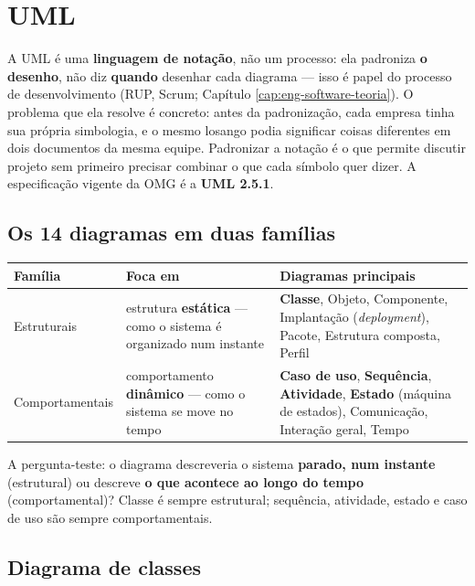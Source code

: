 \section{UML}
\label{sec:uml-teoria}

\begin{conceito}
A UML é uma \textbf{linguagem de notação}, não um processo: ela padroniza
\textbf{o desenho}, não diz \textbf{quando} desenhar cada diagrama --- isso
é papel do processo de desenvolvimento (RUP, Scrum; Capítulo
\ref{cap:eng-software-teoria}). O problema que ela resolve é concreto:
antes da padronização, cada empresa tinha sua própria simbologia, e o
mesmo losango podia significar coisas diferentes em dois documentos da
mesma equipe. Padronizar a notação é o que permite discutir projeto sem
primeiro precisar combinar o que cada símbolo quer dizer. A especificação
vigente da OMG é a \textbf{UML 2.5.1}.
\end{conceito}

\subsection{Os 14 diagramas em duas famílias}

\begin{conceito}
\begin{center}
\begin{tabular}{@{}p{2.6cm}p{2.6cm}p{6.4cm}@{}}
\toprule
\textbf{Família} & \textbf{Foca em} & \textbf{Diagramas principais} \\
\midrule
Estruturais & estrutura \textbf{estática} --- como o sistema é organizado
num instante & \textbf{Classe}, Objeto, Componente, Implantação
(\textit{deployment}), Pacote, Estrutura composta, Perfil \\
Comportamentais & comportamento \textbf{dinâmico} --- como o sistema se
move no tempo & \textbf{Caso de uso}, \textbf{Sequência},
\textbf{Atividade}, \textbf{Estado} (máquina de estados), Comunicação,
Interação geral, Tempo \\
\bottomrule
\end{tabular}
\end{center}
A pergunta-teste: o diagrama descreveria o sistema \textbf{parado, num
instante} (estrutural) ou descreve \textbf{o que acontece ao longo do
tempo} (comportamental)? Classe é sempre estrutural; sequência, atividade,
estado e caso de uso são sempre comportamentais.
\end{conceito}

\subsection{Diagrama de classes}

